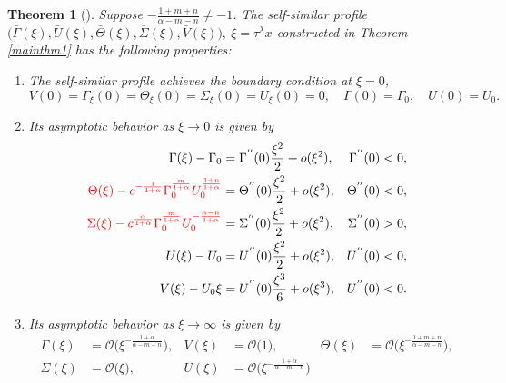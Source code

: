 \documentclass[a4paper,11pt]{article}
\def\red{\color{red}}
\def\bG{{\bar{\Gamma}}}
\def\bV{{\bar{V}}}
\def\bTh{{\bar{\Theta}}}
\def\bS{{\bar{\Sigma}}}
\def\bU{{\bar{U}}}
\def\BO{{\mathcal{O}}}
\newtheorem{theorem}{Theorem}
\theoremstyle{remark}
\begin{document}
\begin{theorem}[\cite{KLT17}] \label{mainthm2}
Suppose $-\frac{1+m+n}{\alpha-m-n}\ne-1$. The self-similar profile $\big(\bG(\xi), \bU(\xi), \bTh(\xi),\bS(\xi),\bV(\xi)\big), \ \xi = \tau^\lambda x$ constructed in Theorem \ref{mainthm1} has the  following properties:

 \begin{enumerate}
  \item[(i)] The self-similar profile achieves the boundary condition at $\xi=0$,
    \begin{equation*}
    {V}(0) = \Gamma_\xi(0) = \Theta_\xi(0)=\Sigma_\xi(0) = {U}_\xi(0)=0, \quad \Gamma(0)=\Gamma_0, \quad U(0)=U_0.
  \end{equation*}
  \item[(ii)] Its asymptotic behavior as $\xi \rightarrow 0$ is given by
  \begin{equation} \label{eq:ss_asymp0}
  \begin{aligned}
    \Gamma(\xi) -\Gamma_0 &= \Gamma^{''}(0)\frac{\xi^2}{2} + o(\xi^2), & \Gamma^{''}(0)&<0,\\
    \red \Theta(\xi) - c^{-\frac{1}{1+\alpha}}\Gamma_0^{\frac{m}{1+\alpha}} U_0^{\frac{1+n}{1+\alpha}} &= \Theta^{''}(0)\frac{\xi^2}{2} + o(\xi^2), & \Theta^{''}(0)&<0,\\
    \red \Sigma(\xi) - c^{\frac{\alpha}{1+\alpha}}\Gamma_0^{\frac{m}{1+\alpha}} U_0^{-\frac{\alpha-n}{1+\alpha}} &= \Sigma^{''}(0)\frac{\xi^2}{2} + o(\xi^2), & \Sigma^{''}(0)&>0, \\
    U(\xi) - U_0 &= U^{''}(0)\frac{\xi^2}{2} + o(\xi^2), & U^{''}(0)&<0,\\
    V(\xi) - U_0\xi &= U^{''}(0)\frac{\xi^3}{6} + o(\xi^3), & U^{''}(0)&<0.
  \end{aligned}
  \end{equation}
  \item[(iii)] Its asymptotic behavior as $\xi \rightarrow \infty$ is given by\\
  \begin{equation} \label{eq:ss_asymp1}
  \begin{aligned}
    \Gamma(\xi) &= \BO\big(\xi^{-\frac{1+\alpha}{\alpha-m-n}}), & V(\xi) &= \BO\big(1), &    \Theta(\xi) &= \BO\big(\xi^{-\frac{1+m+n}{\alpha-m-n}}),\\
   \Sigma(\xi) &= \BO\big(\xi), &   U(\xi) &= \BO\big(\xi^{-\frac{1+\alpha}{\alpha-m-n}})
  \end{aligned}
  \end{equation}
 \end{enumerate}
\end{theorem}
\end{document}
